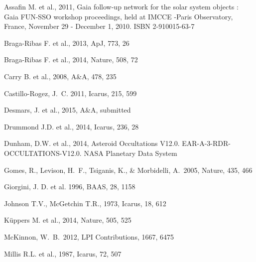 \documentclass[useAMS,usenatbib]{mn2e}
\begin{document}
\begin{thebibliography}{99}

 Assafin M. et al., 2011, Gaia follow-up network for the solar system objects : Gaia FUN-SSO workshop proceedings, held at IMCCE -Paris Observatory, France, November 29 - December 1, 2010. ISBN 2-910015-63-7

 Braga-Ribas F. et al., 2013,
ApJ, 773, 26

 Braga-Ribas F. et al., 2014,
Nature, 508, 72

 Carry B. et al., 2008,
A\&A, 478, 235

 Castillo-Rogez, J.~C. 
2011, Icarus, 215, 599 

 Desmars, J. et al., 2015, A\&A, submitted

 Drummond J.D. et al., 2014,
Icarus, 236, 28

Dunham, D.W. et al., 2014, Asteroid Occultations V12.0. EAR-A-3-RDR-OCCULTATIONS-V12.0. NASA Planetary Data System

 Gomes, R., Levison, H.~F., Tsiganis, K., \& Morbidelli, A.\ 2005, Nature, 435, 466 

 Giorgini, J. D. et al. 1996, BAAS, 28, 1158


 Johnson T.V., McGetchin T.R., 1973,
Icarus, 18, 612

 K\"{u}ppers M. et al., 2014,
Nature, 505, 525

 McKinnon, W.~B.\ 2012, LPI 
Contributions, 1667, 6475 

 Millis R.L. et al., 1987,
Icarus, 72, 507


\end{thebibliography}
\end{document}
